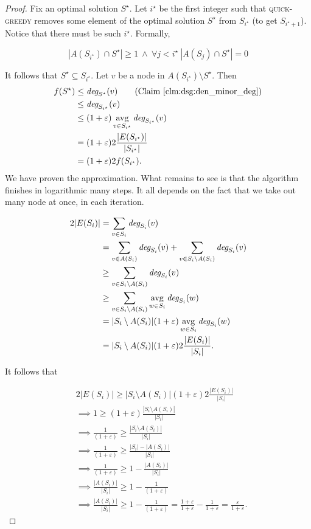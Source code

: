 \begin{proof}
Fix an optimal solution $S^\star$. Let $i^\star$ be the first integer such that \textsc{quick-greedy} removes some element of the optimal solution $S^\star$ from $S_{i^\star}$ (to get $S_{i^\star + 1}$). Notice that there must be such $i^\star$. Formally,

\begin{equation}
	|A(S_{i^\star}) \cap S^\star| \geq 1\ \wedge\ \forall j < i^\star\ |A(S_j) \cap S^\star| = 0
\end{equation}

It follows that $S^\star \subseteq S_{i^\star}$. Let $v$ be a node in $A(S_{i^\star}) \setminus S^\star$. Then
\begin{align}
	f(S^\star) &\leq \deg_{S^\star}(v) \tag{Claim \ref{clm:dsg:den_minor_deg}}\\
	&\leq \deg_{S_{i^\star}}(v)\\
	&\leq (1 + \varepsilon)\avg_{v \in S_{i^\star}}\deg_{S_{i^\star}}(v)\\
	&=(1 + \varepsilon)2\frac{|E(S_{i^\star})|}{|S_{i^\star}|}\\
	&=(1 + \varepsilon)2f(S_{i^\star}).
\end{align}
We have proven the approximation. What remains to see is that the algorithm finishes in logarithmic many steps. It all depends on the fact that we take out many node at once, in each iteration.

\begin{align}
2|E(S_i)| &= \sum_{v \in S_i} \textit{deg}_{S_i}(v)\\
&= \sum_{v \in A(S_i)} \textit{deg}_{S_i}(v) + \sum_{v \in S_i\setminus A(S_i)} \textit{deg}_{S_i}(v)\\
&\geq \sum_{v \in S_i\setminus A(S_i)} \textit{deg}_{S_i}(v)\\
&\geq \sum_{v \in S_i\setminus A(S_i)} \operatorname*{avg}_{w \in S_i}\textit{deg}_{S_i}(w)\\
&=|S_i \setminus A(S_i)|(1 + \varepsilon) \operatorname*{avg}_{w \in S_i}\textit{deg}_{S_i}(w)\\
&=|S_i \setminus A(S_i)|(1 + \varepsilon) 2\frac{|E(S_i)|}{|S_i|}.
\end{align}

It follows that

\begin{align}
&2|E(S_i)| \geq |S_i \setminus A(S_i)|(1 + \varepsilon) 2\frac{|E(S_i)|}{|S_i|}\\
&\implies 1 \geq (1+\varepsilon) \frac{|S_i \setminus A(S_i)|}{|S_i|}\\
&\implies \frac{1}{(1+\varepsilon)} \geq  \frac{|S_i \setminus A(S_i)|}{|S_i|}\\
&\implies \frac{1}{(1+\varepsilon)} \geq  \frac{|S_i| - |A(S_i)|}{|S_i|}\\
&\implies \frac{1}{(1+\varepsilon)} \geq 1 - \frac{|A(S_i)|}{|S_i|}\\
&\implies \frac{|A(S_i)|}{|S_i|} \geq 1 - \frac{1}{(1+\varepsilon)}\\
&\implies \frac{|A(S_i)|}{|S_i|} \geq 1 - \frac{1}{(1+\varepsilon)} = \frac{1 + \varepsilon}{1 + \varepsilon} - \frac{1}{1 + \varepsilon} = \frac{\varepsilon}{1 + \varepsilon}.
\end{align}


\end{proof}
